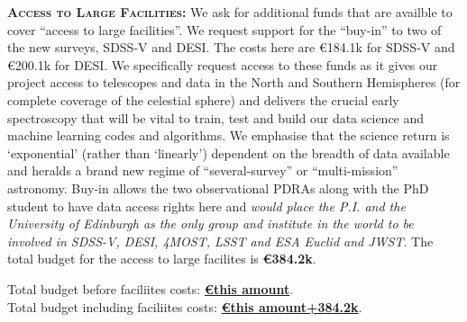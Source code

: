 \smallskip
\smallskip
\noindent
\textbf{\textsc{Access to Large Facilities:}}
We ask for additional funds that are availble to cover ``access to large facilities''. 
We request support for the ``buy-in'' to two of the new surveys,
SDSS-V and DESI. The costs here are \euro184.1k for
SDSS-V and \euro200.1k for DESI.  
We specifically request access to these
funds as it gives our project access to telescopes and data in the
North and Southern Hemispheres (for complete coverage of the celestial
sphere) and delivers the crucial early spectroscopy that will be vital
to train, test and build our data science and machine learning codes
and algorithms.  We emphasise that the science return is `exponential'
(rather than `linearly') dependent on the breadth of data available
and heralds a brand new regime of ``several-survey'' or
``multi-mission'' astronomy. 
Buy-in allows the two observational PDRAs along with the PhD student 
to have data access rights here and 
 {\it would place the
P.I. and the University of Edinburgh as the only group and institute
in the world to be involved in SDSS-V, DESI, 4MOST, LSST and ESA {\it
Euclid} and JWST}.
The total budget for the access to large facilites is {\bf \euro384.2k}.

\smallskip
\smallskip
\noindent
Total budget before faciliites costs: \textbf{\underline{\euro this amount}}. \\
Total budget including faciliites costs: \textbf{\underline{\euro this amount+384.2k}}.\\

